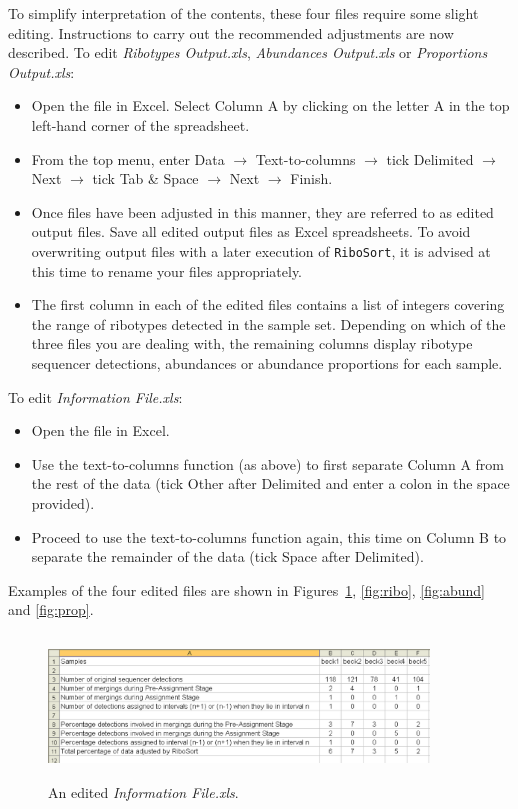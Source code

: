 \documentclass[a4paper]{article}
\begin{document}
To simplify interpretation of the contents, these four files require some slight editing. Instructions to carry out the recommended adjustments are now described.
\newline
\newline
To edit {\em Ribotypes Output.xls}, {\em Abundances Output.xls} or {\em Proportions Output.xls}:
\begin{itemize}
\item Open the file in Excel. Select Column A by clicking on the letter A in the top left-hand corner of the spreadsheet.
\item From the top menu, enter Data $\rightarrow$ Text-to-columns $\rightarrow$ tick Delimited $\rightarrow$ Next $\rightarrow$ tick Tab \& Space $\rightarrow$ Next $\rightarrow$ Finish.
\item Once files have been adjusted in this manner, they are referred to as edited output files. Save all edited output files as Excel spreadsheets. To avoid overwriting output files with a later execution of \texttt{RiboSort}, it is advised at this time to rename your files appropriately.
\item The first column in each of the edited files contains a list of integers covering the range of ribotypes detected in the sample set. Depending on which of the three files you are dealing with, the remaining columns display ribotype sequencer detections, abundances or abundance proportions for each sample. 
\end{itemize}
To edit {\em Information File.xls}:
\begin{itemize}
\item   Open the file in Excel.
\item Use the text-to-columns function (as above) to first separate Column A from the rest of the data (tick Other after Delimited and enter a colon in the space provided).
\item Proceed to use the text-to-columns function again, this time on Column B to separate the remainder of the data (tick Space after Delimited).
\end{itemize}
Examples of the four edited files are shown in Figures~\ref{fig:info}, \ref{fig:ribo}, \ref{fig:abund} and \ref{fig:prop}. 
\vspace{6mm}

\begin{figure}
\centering
\includegraphics[width=0.9\textwidth,height=1.5in]{EPS/picinfo.eps}
\caption{An edited \textit{Information File.xls}.}
\label{fig:info}
\end{figure}
\end{document}
